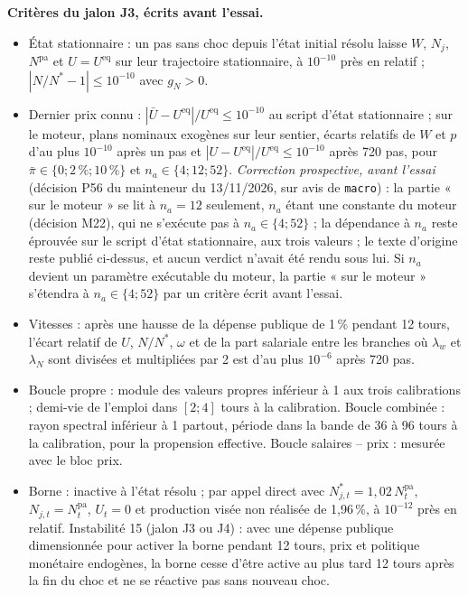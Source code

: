 \documentclass[11pt,a4paper]{article}
\begin{document}
\textbf{Critères du jalon J3, écrits avant l'essai.}
\begin{itemize}
\item État stationnaire : un pas sans choc depuis l'état initial résolu laisse $W$, $N_j$, $N^{\mathrm{pa}}$ et $U = U^{\mathrm{eq}}$ sur leur trajectoire stationnaire, à $10^{-10}$ près en relatif ; $|N/N^{\ast} - 1| \le 10^{-10}$ avec $g_N > 0$.
\item Dernier prix connu : $|\bar U - U^{\mathrm{eq}}|/U^{\mathrm{eq}} \le 10^{-10}$ au script d'état stationnaire ; sur le moteur, plans nominaux exogènes sur leur sentier, écarts relatifs de $W$ et $p$ d'au plus $10^{-10}$ après un pas et $|U - U^{\mathrm{eq}}|/U^{\mathrm{eq}} \le 10^{-10}$ après 720 pas, pour $\bar\pi \in \{0 ; 2\,\% ; 10\,\%\}$ et $n_a \in \{4 ; 12 ; 52\}$. \emph{Correction prospective, avant l'essai} (décision P56 du mainteneur du 13/11/2026, sur avis de \texttt{macro}) : la partie « sur le moteur » se lit à $n_a = 12$ seulement, $n_a$ étant une constante du moteur (décision M22), qui ne s'exécute pas à $n_a \in \{4 ; 52\}$ ; la dépendance à $n_a$ reste éprouvée sur le script d'état stationnaire, aux trois valeurs ; le texte d'origine reste publié ci-dessus, et aucun verdict n'avait été rendu sous lui. Si $n_a$ devient un paramètre exécutable du moteur, la partie « sur le moteur » s'étendra à $n_a \in \{4 ; 52\}$ par un critère écrit avant l'essai.
\item Vitesses : après une hausse de la dépense publique de 1\,\% pendant 12 tours, l'écart relatif de $U$, $N/N^{\ast}$, $\omega$ et de la part salariale entre les branches où $\lambda_w$ et $\lambda_N$ sont divisées et multipliées par 2 est d'au plus $10^{-6}$ après 720 pas.
\item Boucle propre : module des valeurs propres inférieur à 1 aux trois calibrations ; demi-vie de l'emploi dans $[2 ; 4]$ tours à la calibration. Boucle combinée : rayon spectral inférieur à 1 partout, période dans la bande de 36 à 96 tours à la calibration, pour la propension effective. Boucle salaires – prix : mesurée avec le bloc prix.
\item Borne : inactive à l'état résolu ; par appel direct avec $N^{\ast}_{j,t} = 1{,}02\,N^{\mathrm{pa}}_t$, $N_{j,t} = N^{\mathrm{pa}}_t$, $U_t = 0$ et production visée non réalisée de 1,96\,\%, à $10^{-12}$ près en relatif. Instabilité 15 (jalon J3 ou J4) : avec une dépense publique dimensionnée pour activer la borne pendant 12 tours, prix et politique monétaire endogènes, la borne cesse d'être active au plus tard 12 tours après la fin du choc et ne se réactive pas sans nouveau choc.

\end{itemize}
\end{document}
